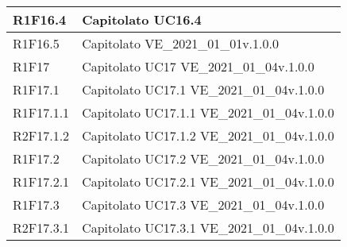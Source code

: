 \begin{center}
\begin{longtable}{|p{22mm}|p{44mm}|}
R1F16.4 &
Capitolato \newline
UC16.4 \newline
\\
\hline

R1F16.5 &
Capitolato \newline
VE\_2021\_01\_01v.1.0.0 \newline
\\
\hline

R1F17 &
Capitolato \newline
UC17 \newline
VE\_2021\_01\_04v.1.0.0 \newline
\\
\hline

R1F17.1 &
Capitolato \newline
UC17.1 \newline
VE\_2021\_01\_04v.1.0.0 \newline
\\
\hline

R1F17.1.1 &
Capitolato \newline
UC17.1.1 \newline
VE\_2021\_01\_04v.1.0.0 \newline
\\
\hline

R2F17.1.2 &
Capitolato \newline
UC17.1.2 \newline
VE\_2021\_01\_04v.1.0.0 \newline
\\
\hline

R1F17.2 &
Capitolato \newline
UC17.2 \newline
VE\_2021\_01\_04v.1.0.0 \newline
\\
\hline

R1F17.2.1 &
Capitolato \newline
UC17.2.1 \newline
VE\_2021\_01\_04v.1.0.0 \newline
\\
\hline

R1F17.3 &
Capitolato \newline
UC17.3 \newline
VE\_2021\_01\_04v.1.0.0 \newline
\\
\hline

R2F17.3.1 &
Capitolato \newline
UC17.3.1 \newline
VE\_2021\_01\_04v.1.0.0 \newline
\\
\hline


\end{longtable}
\end{center}
